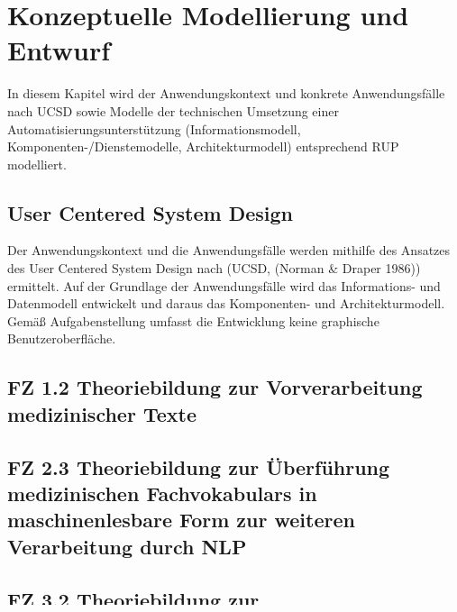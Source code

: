 \chapter{Konzeptuelle Modellierung und Entwurf}
\label{ch:modellierung}
In diesem Kapitel wird der Anwendungskontext und konkrete Anwendungsfälle nach UCSD sowie Modelle der technischen Umsetzung einer Automatisierungsunterstützung (Informationsmodell, Komponenten-/Dienstemodelle, Architekturmodell) entsprechend RUP modelliert.

\section{User Centered System Design }

Der Anwendungskontext und die Anwendungsfälle werden mithilfe des Ansatzes des User Centered System Design nach (UCSD, (Norman & Draper 1986)) ermittelt. Auf der Grundlage der Anwendungsfälle wird das Informations- und Datenmodell entwickelt und daraus das Komponenten- und Architekturmodell.
Gemäß Aufgabenstellung umfasst die Entwicklung keine graphische Benutzeroberfläche.



\section{FZ 1.2 Theoriebildung zur Vorverarbeitung medizinischer Texte}
\label{sec:FZ1.2} 

\section{FZ 2.3 Theoriebildung zur Überführung medizinischen Fachvokabulars in maschinenlesbare Form zur weiteren Verarbeitung durch NLP}
\label{sec:FZ2.3} 

\section{FZ 3.2 Theoriebildung zur Wissensrepräsentation}
\label{sec:FZ3.2} 
